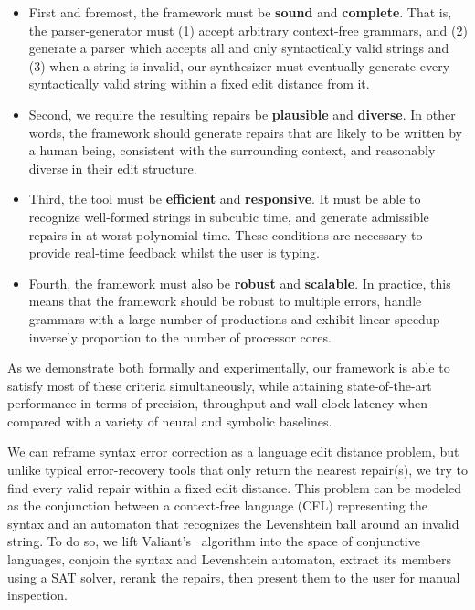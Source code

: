 \documentclass[sigplan,screen]{acmart}
\begin{document}
\begin{itemize}
  \item First and foremost, the framework must be \textbf{sound} and \textbf{complete}. That is, the parser-generator must (1) accept arbitrary context-free grammars, and (2) generate a parser which accepts all and only syntactically valid strings and (3) when a string is invalid, our synthesizer must eventually generate every syntactically valid string within a fixed edit distance from it.
  \item Second, we require the resulting repairs be \textbf{plausible} and \textbf{diverse}. In other words, the framework should generate repairs that are likely to be written by a human being, consistent with the surrounding context, and reasonably diverse in their edit structure.
  \item Third, the tool must be \textbf{efficient} and \textbf{responsive}. It must be able to recognize well-formed strings in subcubic time, and generate admissible repairs in at worst polynomial time. These conditions are necessary to provide real-time feedback whilst the user is typing.
  \item Fourth, the framework must also be \textbf{robust} and \textbf{scalable}. In practice, this means that the framework should be robust to multiple errors, handle grammars with a large number of productions and exhibit linear speedup inversely proportion to the number of processor cores.
\end{itemize}

As we demonstrate both formally and experimentally, our framework is able to satisfy most of these criteria simultaneously, while attaining state-of-the-art performance in terms of precision, throughput and wall-clock latency when compared with a variety of neural and symbolic baselines.

We can reframe syntax error correction as a language edit distance problem, but unlike typical error-recovery tools that only return the nearest repair(s), we try to find every valid repair within a fixed edit distance. This problem can be modeled as the conjunction between a context-free language (CFL) representing the syntax and an automaton that recognizes the Levenshtein ball around an invalid string. To do so, we lift Valiant's~\cite{valiant1975general} algorithm into the space of conjunctive languages, conjoin the syntax and Levenshtein automaton, extract its members using a SAT solver, rerank the repairs, then present them to the user for manual inspection.
\end{document}

